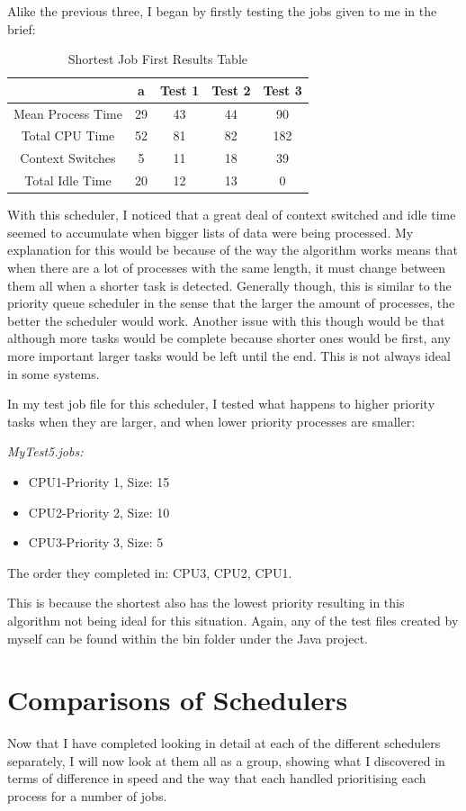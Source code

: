 \documentclass{sig-alternate}
\begin{document}
\vspace{3mm}
Alike the previous three, I began by firstly testing the jobs given to me in the
brief:
\begin{table}[!h]
\centering
\caption{Shortest Job First Results Table}
\begin{tabular}{|c|c|c|c|c|} \hline
&a&Test 1&Test 2&Test 3\\ \hline
Mean Process Time&29&43&44&90\\ \hline
Total CPU Time&52&81&82&182\\ \hline
Context Switches&5&11&18&39\\ \hline
Total Idle Time&20&12&13&0\\ \hline
\end{tabular}
\end{table}

With this scheduler, I noticed that a great deal of context switched and idle
time seemed to accumulate when bigger lists of data were being processed. My
explanation for this would be because of the way the algorithm works means that
when there are a lot of processes with the same length, it must change between
them all when a shorter task is detected. Generally though, this is similar to
the priority queue scheduler in the sense that the larger the amount of
processes, the better the scheduler would work. Another issue with this though
would be that although more tasks would be complete because shorter ones would
be first, any more important larger tasks would be left until the end. This is
not always ideal in some systems.

In my test job file for this scheduler, I tested what happens to higher priority
tasks when they are larger, and when lower priority processes are smaller:

\vspace{3mm}
\textit{MyTest5.jobs:}
\begin{itemize}
\item{CPU1-Priority 1, Size: 15}
\item{CPU2-Priority 2, Size: 10}
\item{CPU3-Priority 3, Size: 5}
\end{itemize}
The order they completed in: CPU3, CPU2, CPU1.

This is because the shortest also has the lowest priority resulting in this
algorithm not being ideal for this situation. Again, any of the test files
created by myself can be found within the bin folder under the Java project.

\section{Comparisons of Schedulers}
Now that I have completed looking in detail at each of the different schedulers
separately, I will now look at them all as a group, showing what I discovered in
terms of difference in speed and the way that each handled prioritising each
process for a number of jobs.
\end{document}
